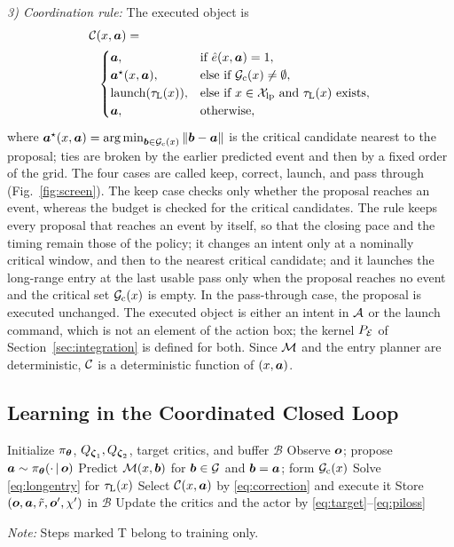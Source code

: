 \textit{3) Coordination rule:} The executed object is
\begin{equation}\label{eq:correction}
\begin{aligned}
&\mathcal{C}(x,\boldsymbol{a})=\\
&\ \ \begin{cases}
\boldsymbol{a}, & \text{if }\hat{e}(x,\boldsymbol{a})=1,\\
\boldsymbol{a}^{\star}(x,\boldsymbol{a}), & \text{else if }\mathcal{G}_{\mathrm{c}}(x)\neq\emptyset,\\
\mathrm{launch}(\tau_{\mathrm{L}}(x)), & \text{else if }x\in\mathcal{X}_{\mathrm{lp}}\text{ and }\tau_{\mathrm{L}}(x)\text{ exists},\\
\boldsymbol{a}, & \text{otherwise},
\end{cases}
\end{aligned}
\end{equation}
where $\boldsymbol{a}^{\star}(x,\boldsymbol{a})=\operatorname*{arg\,min}_{\boldsymbol{b}\in\mathcal{G}_{\mathrm{c}}(x)}\left\lVert \boldsymbol{b}-\boldsymbol{a} \right\rVert$ is the critical candidate nearest to the proposal; ties are broken by the earlier predicted event and then by a fixed order of the grid. The four cases are called keep, correct, launch, and pass through (Fig.~\ref{fig:screen}). The keep case checks only whether the proposal reaches an event, whereas the budget is checked for the critical candidates. The rule keeps every proposal that reaches an event by itself, so that the closing pace and the timing remain those of the policy; it changes an intent only at a nominally critical window, and then to the nearest critical candidate; and it launches the long-range entry at the last usable pass only when the proposal reaches no event and the critical set $\mathcal{G}_{\mathrm{c}}(x)$ is empty. In the pass-through case, the proposal is executed unchanged. The executed object is either an intent in $\mathcal{A}$ or the launch command, which is not an element of the action box; the kernel $P_{\mathcal{E}}$ of Section~\ref{sec:integration} is defined for both. Since $\mathcal{M}$ and the entry planner are deterministic, $\mathcal{C}$ is a deterministic function of $(x,\boldsymbol{a})$.

\subsection{Learning in the Coordinated Closed Loop}\label{sec:learning}

\begin{algorithm}[t]
\caption{ECC Decision and Learning Loop}
\label{alg:ecc}
\small
\begin{algorithmic}[1]
\State Initialize $\pi_{\boldsymbol{\theta}}$, $Q_{\boldsymbol{\zeta}_{1}},Q_{\boldsymbol{\zeta}_{2}}$, target critics, and buffer $\mathcal{B}$ 
  \State Observe $\boldsymbol{o}$; propose $\boldsymbol{a}\sim\pi_{\boldsymbol{\theta}}(\cdot\,|\,\boldsymbol{o})$
  \State Predict $\mathcal{M}(x,\boldsymbol{b})$ for $\boldsymbol{b}\in\mathcal{G}$ and $\boldsymbol{b}=\boldsymbol{a}$; form $\mathcal{G}_{\mathrm{c}}(x)$
    \State Solve \eqref{eq:longentry} for $\tau_{\mathrm{L}}(x)$
  \EndIf
  \State Select $\mathcal{C}(x,\boldsymbol{a})$ by \eqref{eq:correction} and execute it
  \State Store $(\boldsymbol{o},\boldsymbol{a},\tilde{r},\boldsymbol{o}',\chi')$ in $\mathcal{B}$ 
  \State Update the critics and the actor by \eqref{eq:target}--\eqref{eq:piloss} 
\EndFor
\end{algorithmic}
\textit{Note:} Steps marked T belong to training only.
\end{algorithm}

